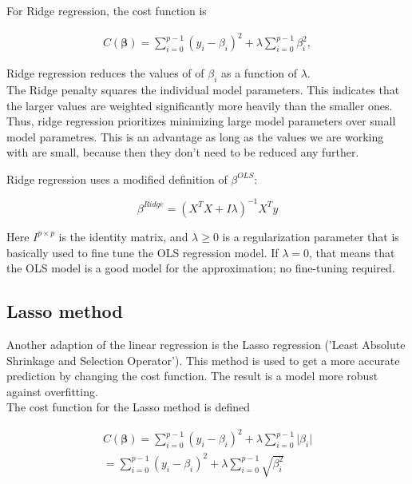 \documentclass[reprint,english,notitlepage]{revtex4-1}  %
\begin{document}
For Ridge regression, the cost function is


\begin{align}
    C(\boldsymbol{\beta})=\sum_{i=0}^{p-1}(y_i-\beta_i)^2+\lambda\sum_{i=0}^{p-1}\beta_i^2,
\end{align}


Ridge regression reduces the values of of $\beta_i$  as a function of $\lambda$. \\ The Ridge penalty squares the individual model parameters. This indicates that the larger values are weighted significantly more heavily than the smaller ones. Thus, ridge regression prioritizes minimizing large model parameters over small model parametres. This is an advantage as long as the values we are working with are small, because then they don’t need to be reduced any further. 



Ridge regression uses a modified definition of $\beta^{OLS}$:


\begin{equation}\label{eq:ridge}
    \beta^{Ridge} = (X^TX + I\lambda)^{-1}X^Ty
\end{equation}


Here $I^{p \times p}$ is the identity matrix, and $\lambda \geq 0$ is a regularization parameter that is basically used to fine tune the OLS regression model. If $\lambda = 0$, that means that the OLS model is a good model for the approximation; no fine-tuning required. \\





\subsection{Lasso method}

\footnotemark[\value{footnote}] Another adaption of the linear regression is the Lasso regression ('Least Absolute Shrinkage and Selection Operator'). This method is used to get a more accurate prediction by changing the cost function. The result is a model more robust against overfitting. \\

The cost function for the Lasso method is defined

\begin{align}
    C(\boldsymbol{\beta})=\sum_{i=0}^{p-1}(y_i-\beta_i)^2+\lambda\sum_{i=0}^{p-1}\vert\beta_i\vert \\ =\sum_{i=0}^{p-1}(y_i-\beta_i)^2+\lambda\sum_{i=0}^{p-1}\sqrt{\beta_i^2}
\end{align}
\end{document}
